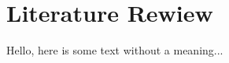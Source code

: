 \documentclass[../main.tex]{subfiles}
\begin{document}
\section{Literature Rewiew}

Hello, here is some text without a meaning...
\end{document}
